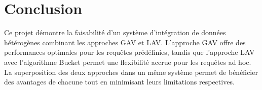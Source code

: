 \documentclass[12pt,a4paper]{article}
\begin{document}
\section{Conclusion}

Ce projet démontre la faisabilité d'un système d'intégration de données hétérogènes combinant les approches GAV et LAV. L'approche GAV offre des performances optimales pour les requêtes prédéfinies, tandis que l'approche LAV avec l'algorithme Bucket permet une flexibilité accrue pour les requêtes ad hoc. La superposition des deux approches dans un même système permet de bénéficier des avantages de chacune tout en minimisant leurs limitations respectives.
\end{document}

